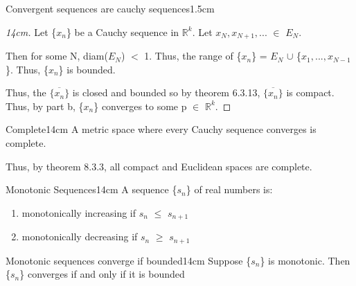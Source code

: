 \begin{ltheorem}{Convergent sequences are cauchy sequences}{1.5cm}
            \begin{proof}[14cm]
                Let \{$x_n$\} be a Cauchy sequence in $\mathbb{R}^k$.
				Let $x_N, x_{N+1}, ... $ $\in$ $E_N$.

				Then for some N, diam($E_N$) $<$ 1.
				Thus, the range of \{$x_n$\}
                = $E_N$ $\cup$ \{$x_1, ... , x_{N-1}$\}.
				Thus, \{$x_n$\} is bounded.

				Thus, the $\overline{\{x_n\}}$ is closed and bounded so by
                {\color{red} theorem 6.3.13}, $\overline{\{x_n\}}$ is compact.
				Thus, by part b, \{$x_n$\} converges to some
                p $\in$ $\mathbb{R}^k$.
            \end{proof}
    \end{ltheorem}

    \newpage


    
    \begin{definition}{Complete}{14cm}
        A metric space where every Cauchy sequence converges is complete.

		Thus, by {\color{red} theorem 8.3.3}, all compact and Euclidean
		spaces are complete.
    \end{definition}
    
    \vspace{0.5cm}



    \begin{definition}{Monotonic Sequences}{14cm}
        A sequence \{$s_n$\} of real numbers is:
    \end{definition}

	\begin{enumerate}[label=(\alph*), leftmargin=2cm, itemsep=0.1cm]
		\item monotonically increasing if $s_n$ $\leq$ $s_{n+1}$
		
		\item monotonically decreasing if $s_n$ $\geq$ $s_{n+1}$ \\
	\end{enumerate}

    \vspace{0.5cm}



    \begin{wtheorem}{Monotonic sequences converge if bounded}{14cm}
        Suppose \{$s_n$\} is monotonic. Then \{$s_n$\} converges if
		and only if it is bounded
    \end{wtheorem}
    
